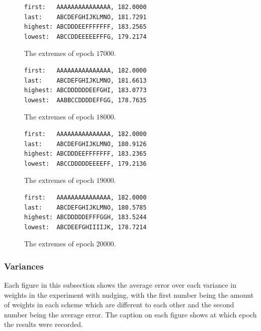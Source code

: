 \documentclass[a4paper, 10pt, notitlepage, twocolumn]{article}
\begin{document}
\begin{figure}[!ht]
 \begin{verbatim}
first:   AAAAAAAAAAAAAAA, 182.0000
last:    ABCDEFGHIJKLMNO, 181.7291
highest: ABCDDDEEFFFFFFF, 183.2565
lowest:  ABCCDDEEEEEFFFG, 179.2174
 \end{verbatim}
 \vspace{-20pt} 
 \caption{The extremes of epoch $17000$.}
\end{figure}


\begin{figure}[!ht]
 \begin{verbatim}
first:   AAAAAAAAAAAAAAA, 182.0000
last:    ABCDEFGHIJKLMNO, 181.6613
highest: ABCDDDDDDEEFGHI, 183.0773
lowest:  AABBCCDDDDEFFGG, 178.7635
 \end{verbatim}
 \vspace{-20pt} 
 \caption{The extremes of epoch $18000$.}
\end{figure}

\begin{figure}[!ht]
 \begin{verbatim}
first:   AAAAAAAAAAAAAAA, 182.0000
last:    ABCDEFGHIJKLMNO, 180.9126
highest: ABCDDDEEFFFFFFF, 183.2365
lowest:  ABCCDDDDDEEEEFF, 179.2136
 \end{verbatim}
 \vspace{-20pt} 
 \caption{The extremes of epoch $19000$.}
\end{figure}


\begin{figure}[!ht]
 \begin{verbatim}
first:   AAAAAAAAAAAAAAA, 182.0000
last:    ABCDEFGHIJKLMNO, 180.5785
highest: ABCDDDDDEFFFGGH, 183.5244
lowest:  ABCDEEFGHIIIIJK, 178.7214
 \end{verbatim}
 \vspace{-20pt} 
 \caption{The extremes of epoch $20000$.}
\end{figure}

\FloatBarrier

\subsubsection{Variances}

Each figure in this subsection shows the average error over each variance in weights in the experiment with nudging, with the first number being the amount of weights in each scheme which are different to each other and the second number being the average error. The caption on each figure shows at which epoch the results were recorded.
\end{document}
